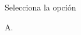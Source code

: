 \begin{UCtrayectoria}
	\UCpaso[\UCactor] Selecciona la opción 
\end{UCtrayectoria}

\begin{UCtrayectoriaA}{A}{.}
	
\end{UCtrayectoriaA}

